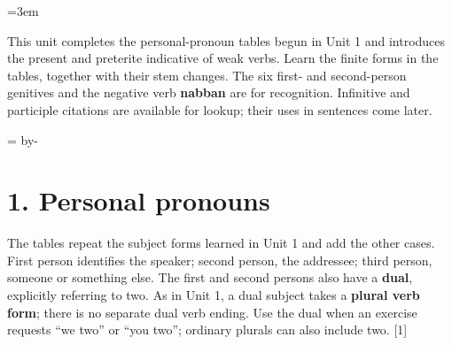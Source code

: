 \BookRecto
\begingroup
\renewcommand{\runningtitle}{Unit 2. Pronouns and weak verbs}
\emergencystretch=3em
\newcommand{\itempara}[2]{\par\addvspace{3pt}\noindent\hangindent=1.8em\hangafter=1\makebox[1.8em][l]{#1.}#2\par}
\newcommand{\reserve}[1]{\par\begingroup\dimen0=\pagegoal\advance\dimen0 by-\pagetotal\ifdim\dimen0<#1\newpage\fi\endgroup}

\raggedright
{}

This unit completes the personal-pronoun tables begun in Unit 1 and introduces the present and preterite indicative of weak verbs. Learn the finite forms in the tables, together with their stem changes. The six first- and second-person genitives and the negative verb \textbf{nabban} are for recognition. Infinitive and participle citations are available for lookup; their uses in sentences come later.

\reserve{7\baselineskip}
\section*{1. Personal pronouns}

The tables repeat the subject forms learned in Unit 1 and add the other cases. First person identifies the speaker; second person, the addressee; third person, someone or something else. The first and second persons also have a \textbf{dual}, explicitly referring to two. As in Unit 1, a dual subject takes a \textbf{plural verb form}; there is no separate dual verb ending. Use the dual when an exercise requests “we two” or “you two”; ordinary plurals can also include two. [1]

